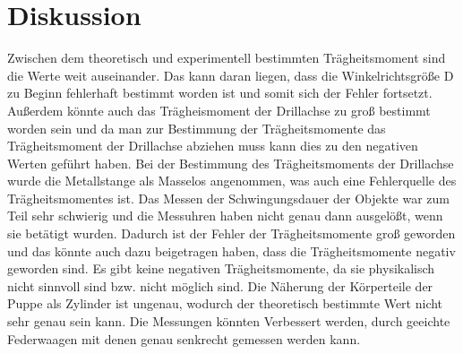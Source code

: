 \section{Diskussion}
Zwischen dem theoretisch und experimentell bestimmten Trägheitsmoment sind die Werte weit auseinander.
Das kann daran liegen, dass die Winkelrichtsgröße D zu Beginn fehlerhaft bestimmt worden ist
und somit sich der Fehler fortsetzt. Außerdem könnte auch das Trägheismoment der Drillachse
zu groß bestimmt worden sein und da man zur Bestimmung der Trägheitsmomente das Trägheitsmoment
der Drillachse abziehen muss kann dies zu den negativen Werten geführt haben.
Bei der Bestimmung des Trägheitsmoments der Drillachse wurde die Metallstange
als Masselos angenommen, was auch eine Fehlerquelle des Trägheitsmomentes ist.
Das Messen der Schwingungsdauer der Objekte war zum Teil sehr schwierig und die
Messuhren haben nicht genau dann ausgelößt, wenn sie betätigt wurden. Dadurch ist
der Fehler der Trägheitsmomente groß geworden und das könnte auch dazu beigetragen
haben, dass die Trägheitsmomente negativ geworden sind.
Es gibt keine negativen Trägheitsmomente, da sie physikalisch nicht sinnvoll sind
bzw. nicht möglich sind.
Die Näherung der Körperteile der Puppe als Zylinder ist ungenau, wodurch der
theoretisch bestimmte Wert nicht sehr genau sein kann.
Die Messungen könnten Verbessert werden, durch geeichte Federwaagen mit denen
genau senkrecht gemessen werden kann.
